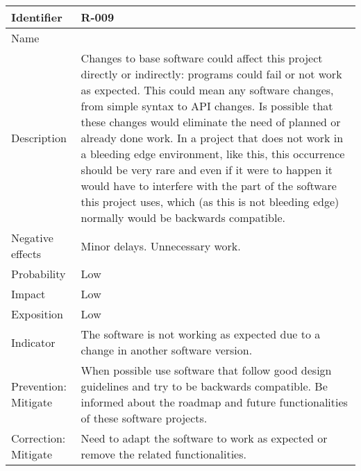 \begin{table}[H]
	\begin{tabularx}{\textwidth}{|y|z|}
		\hline
		Identifier & \textbf{R-009} \\ \hline
		Name & \Rnueve \\ \hline
		Description &
			Changes to base software could affect this project directly or indirectly: programs could fail or not work as expected. \linej
			This could mean any software changes, from simple syntax to API changes. \linej
			Is possible that these changes would eliminate the need of planned or already done work. \linej
			In a project that does not work in a bleeding edge environment, like this, this occurrence should be very rare and even if it were to happen it would have to interfere with the part of the software this project uses, which (as this is not bleeding edge) normally would be backwards compatible.
		\\ \hline
		Negative effects &
			Minor delays. \linej
			Unnecessary work.
		\\ \hline
		Probability & Low\\ \hline
		Impact & Low \\ \hline
		Exposition &  Low\\ \hline
		Indicator & The software is not working as expected due to a change in another software version.\\ \hline
		Prevention: Mitigate &
			When possible use software that follow good design guidelines and try to be backwards compatible. \linej
			Be informed about the roadmap and future functionalities of these software projects.
		\\ \hline
		Correction: Mitigate &
			Need to adapt the software to work as expected or remove the related functionalities.
		\\ \hline
	\end{tabularx}
\end{table}

